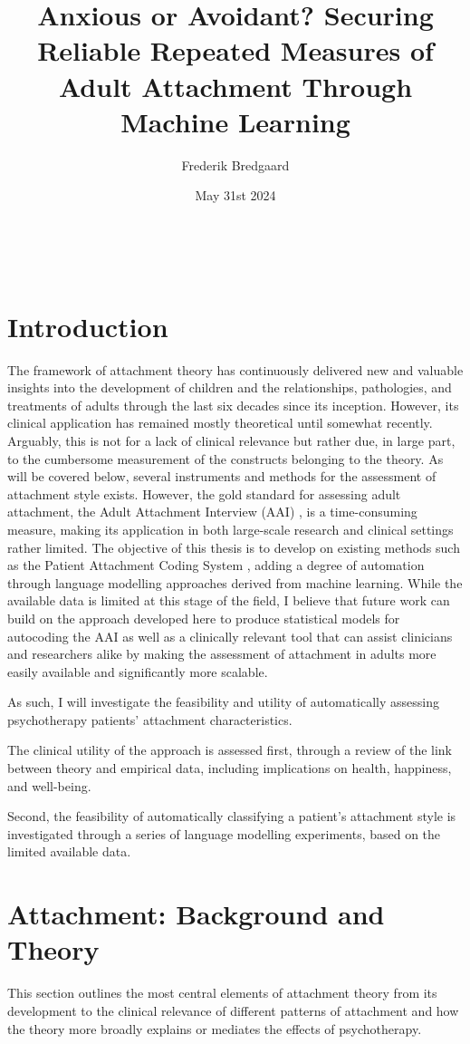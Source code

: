 \documentclass[12pt]{report}
\title{Anxious or Avoidant? Securing Reliable Repeated Measures of Adult Attachment Through Machine Learning}
\author{Frederik Bredgaard}
\date{May 31st 2024}
\begin{document}
\maketitle
\
\tableofcontents

\chapter*{Introduction}
The framework of attachment theory has continuously delivered new and valuable insights into the development of children and the relationships, pathologies, and treatments of adults through the last six decades since its inception.
However, its clinical application has remained mostly theoretical until somewhat recently. Arguably, this is not for a lack of clinical relevance but rather due, in large part, to the cumbersome measurement of the constructs belonging to the theory.
As will be covered below, several instruments and methods for the assessment of attachment style exists. However, the gold standard for assessing adult attachment, the Adult Attachment Interview (AAI) \cite{AAITest}, is a time-consuming measure, making its application in both large-scale research and clinical settings rather limited.
The objective of this thesis is to develop on existing methods such as the Patient Attachment Coding System \cite{Talia2017}, adding a degree of automation through language modelling approaches derived from machine learning.
While the available data is limited at this stage of the field, I believe that future work can build on the approach developed here to produce statistical models for autocoding the AAI as well as a clinically relevant tool that can assist clinicians and researchers alike by making the assessment of attachment in adults more easily available and significantly more scalable.

As such, I will investigate the feasibility and utility of automatically assessing psychotherapy patients' attachment characteristics.

The clinical utility of the approach is assessed first, through a review of the link between theory and empirical data, including implications on health, happiness, and well-being.

Second, the feasibility of automatically classifying a patient's attachment style is investigated through a series of language modelling experiments, based on the limited available data.
\chapter{Attachment: Background and Theory}
This section outlines the most central elements of attachment theory from its development to the clinical relevance of different patterns of attachment and how the theory more broadly explains or mediates the effects of psychotherapy.
\end{document}
